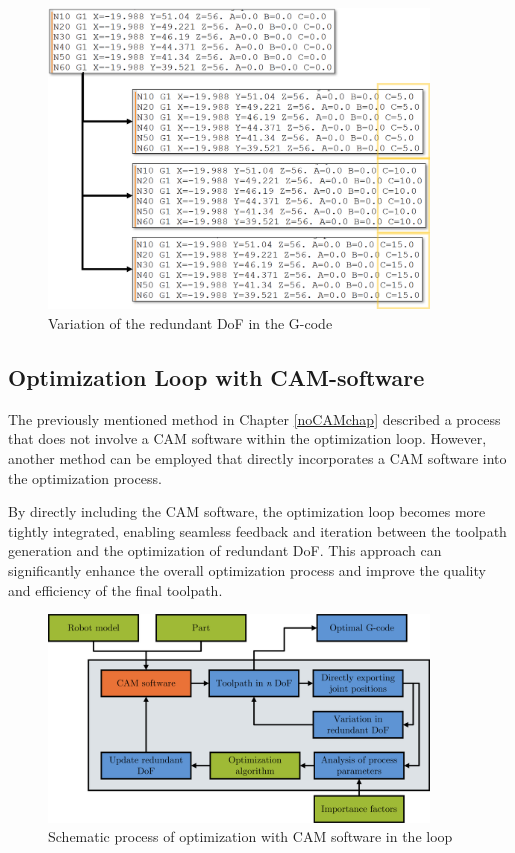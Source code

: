 \begin{figure}[H]
	\centerline{\includegraphics[width=0.9\textwidth]{figures/gcodevariation.png}}
	\caption{Variation of the redundant DoF in the G-code}
	\label{variation}
\end{figure}


\subsection{Optimization Loop with CAM-software}

The previously mentioned method in Chapter \ref{noCAMchap} described a process that does not involve a \acrshort{CAM} software within the optimization loop. However, another method can be employed that directly incorporates a \acrshort{CAM} software into the optimization process.


By directly including the \acrshort{CAM} software, the optimization loop becomes more tightly integrated, enabling seamless feedback and iteration between the toolpath generation and the optimization of redundant \acrshort{DoF}. This approach can significantly enhance the overall optimization process and improve the quality and efficiency of the final toolpath.



 \begin{figure}[H]
 	\centerline{\includegraphics[width=0.9\textwidth]{figures/CAMloop.png}}
 	\caption{Schematic process of optimization with CAM software in the loop}
 	\label{CAMloop}
 \end{figure}

